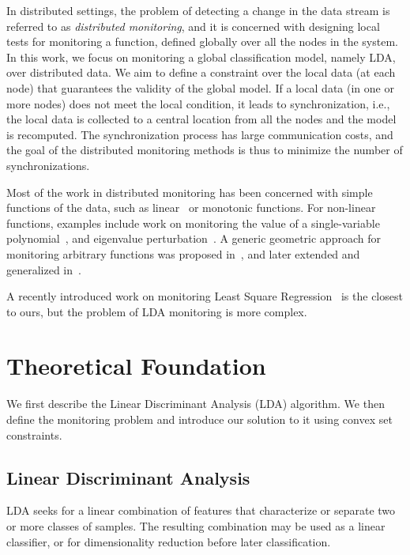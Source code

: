 \documentclass{sig-alternate-05-2015}
\begin{document}
In distributed settings, the problem of detecting a change in the data stream is referred to as {\em distributed monitoring}, and it is concerned with designing local tests for monitoring a function, defined globally over all the nodes in the system. 
In this work, we focus on monitoring a global classification model, namely LDA, over distributed data. 
We aim to define a constraint over the local data (at each node) that guarantees the validity of the global model. If a local data (in one or more nodes) does not meet the local condition, it leads to synchronization, i.e., the local data is collected to a central location from all the nodes and the model is recomputed. 
The synchronization process has large communication costs, and the goal of the distributed monitoring methods is thus to minimize the number of synchronizations.

Most of the work in distributed monitoring has been concerned with simple functions of the data, such as linear~\cite{keralapura2006communication, kashyap2008efficient} or monotonic \cite{michel2005klee} functions. For non-linear functions, examples include work on monitoring the value of a single-variable polynomial~\cite{shah2008handling}, and eigenvalue perturbation~\cite{huang2007communication}. A generic geometric approach for monitoring arbitrary functions was proposed in~\cite{sharfman2007geometric}, and later extended and generalized in~\cite{keren2012shape,lazerson2015monitoring}.

A recently introduced work on monitoring Least Square Regression~\cite{gabel2015monitoring} is the closest to ours, but the problem of LDA monitoring is more complex.

 
\section{Theoretical Foundation}
We first describe the Linear Discriminant Analysis (LDA) algorithm. We then define the monitoring 
problem and introduce our solution to it using convex set constraints.   

\subsection{Linear Discriminant Analysis}%
LDA seeks for a linear combination of features that characterize or separate two or more classes of samples.
The resulting combination may be used as a linear classifier, or for dimensionality reduction before later classification.
\end{document}
